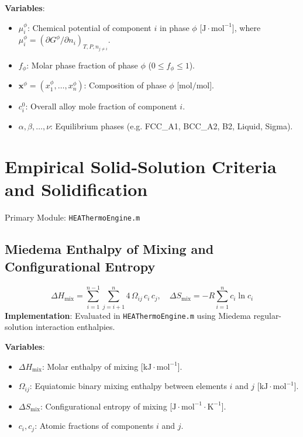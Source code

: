 \documentclass[11pt,a4paper]{article}
\begin{document}
\noindent\textbf{Variables}:
\begin{itemize}
  \item $\mu_i^\phi$: Chemical potential of component $i$ in phase $\phi$ [$\text{J}\cdot\text{mol}^{-1}$], where $\mu_i^\phi = (\partial G^\phi / \partial n_i)_{T, P, n_{j \ne i}}$.
  \item $f_\phi$: Molar phase fraction of phase $\phi$ ($0 \le f_\phi \le 1$).
  \item $\mathbf{x}^\phi = (x_1^\phi, \dots, x_n^\phi)$: Composition of phase $\phi$ [$\text{mol/mol}$].
  \item $c_i^0$: Overall alloy mole fraction of component $i$.
  \item $\alpha, \beta, \dots, \nu$: Equilibrium phases (e.g. FCC\_A1, BCC\_A2, B2, Liquid, Sigma).
\end{itemize}

\section{Empirical Solid-Solution Criteria and Solidification}
Primary Module: \texttt{HEAThermoEngine.m}

\subsection{Miedema Enthalpy of Mixing and Configurational Entropy}
\begin{equation}
\Delta H_{\text{mix}} = \sum_{i=1}^{n-1}\sum_{j=i+1}^n 4 \, \Omega_{ij} \, c_i \, c_j, \quad \Delta S_{\text{mix}} = -R \sum_{i=1}^n c_i \ln c_i
\end{equation}
\textbf{Implementation}: Evaluated in \texttt{HEAThermoEngine.m} using Miedema regular-solution interaction enthalpies.

\noindent\textbf{Variables}:
\begin{itemize}
  \item $\Delta H_{\text{mix}}$: Molar enthalpy of mixing [$\text{kJ}\cdot\text{mol}^{-1}$].
  \item $\Omega_{ij}$: Equiatomic binary mixing enthalpy between elements $i$ and $j$ [$\text{kJ}\cdot\text{mol}^{-1}$].
  \item $\Delta S_{\text{mix}}$: Configurational entropy of mixing [$\text{J}\cdot\text{mol}^{-1}\cdot\text{K}^{-1}$].
  \item $c_i, c_j$: Atomic fractions of components $i$ and $j$.
\end{itemize}
\end{document}
